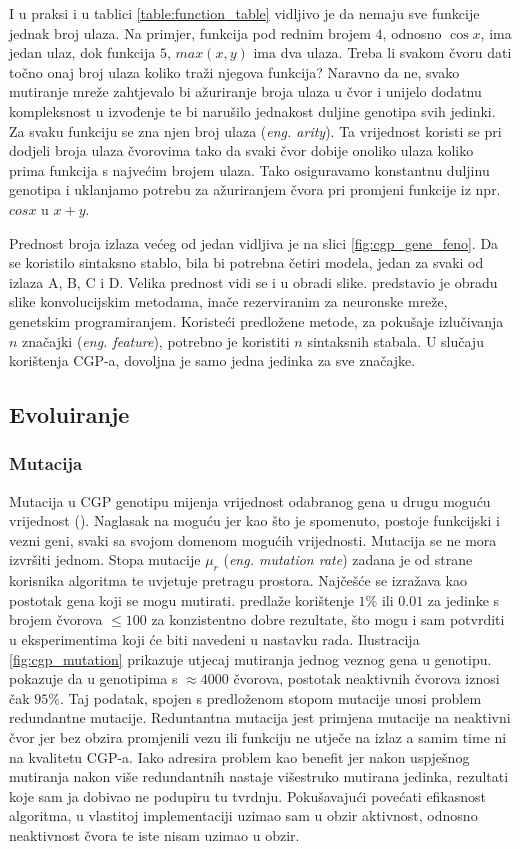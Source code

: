 I u praksi i u tablici \ref{table:function_table} vidljivo je da nemaju sve funkcije jednak broj ulaza.
Na primjer, funkcija pod rednim brojem $4$, odnosno $\cos{x}$, ima jedan ulaz, dok funkcija $5$, $max(x, y)$ ima dva ulaza.
Treba li svakom čvoru dati točno onaj broj ulaza koliko traži njegova funkcija?
Naravno da ne, svako mutiranje mreže zahtjevalo bi ažuriranje broja ulaza u čvor i unijelo dodatnu kompleksnost u izvođenje te bi narušilo jednakost duljine genotipa svih jedinki.
Za svaku funkciju se zna njen broj ulaza (\emph{eng. arity}).
Ta vrijednost koristi se pri dodjeli broja ulaza čvorovima tako da svaki čvor dobije onoliko ulaza koliko prima funkcija s najvećim brojem ulaza.
Tako osiguravamo konstantnu duljinu genotipa i uklanjamo potrebu za ažuriranjem čvora pri promjeni funkcije iz npr. $cos{x}$ u $x + y$.

Prednost broja izlaza većeg od jedan vidljiva je na slici \ref{fig:cgp_gene_feno}.
Da se koristilo sintaksno stablo, bila bi potrebna četiri modela, jedan za svaki od izlaza A, B, C i D.
Velika prednost vidi se i u obradi slike.
\cite{conv_gp} predstavio je obradu slike konvolucijskim metodama, inače rezerviranim za neuronske mreže, genetskim programiranjem.
Koristeći predložene metode, za pokušaje izlučivanja $n$ značajki (\emph{eng. feature}), potrebno je koristiti $n$ sintaksnih stabala.
U slučaju korištenja CGP-a, dovoljna je samo jedna jedinka za sve značajke.

\subsection{Evoluiranje}

\subsubsection{Mutacija}
Mutacija u CGP genotipu mijenja vrijednost odabranog gena u drugu moguću vrijednost (\cite{cgp}).
Naglasak na moguću jer kao što je spomenuto, postoje funkcijski i vezni geni, svaki sa svojom domenom mogućih vrijednosti.
Mutacija se ne mora izvršiti jednom.
Stopa mutacije $\mu_r$ (\emph{eng. mutation rate}) zadana je od strane korisnika algoritma te uvjetuje pretragu prostora.
Najčešće se izražava kao postotak gena koji se mogu mutirati.
\cite{cgp} predlaže korištenje $1\%$ ili $0.01$ za jedinke s brojem čvorova $\leq 100$ za konzistentno dobre rezultate, što mogu i sam potvrditi u eksperimentima koji će biti navedeni u nastavku rada.
Ilustracija \ref{fig:cgp_mutation} prikazuje utjecaj mutiranja jednog veznog gena u genotipu.
\cite{cgp_experiment} pokazuje da u genotipima s $\approx 4000$ čvorova, postotak neaktivnih čvorova iznosi čak $95\%$.
Taj podatak, spojen s predloženom stopom mutacije unosi problem redundantne mutacije.
Reduntantna mutacija jest primjena mutacije na neaktivni čvor jer bez obzira promjenili vezu ili funkciju ne utječe na izlaz a samim time ni na kvalitetu CGP-a.
Iako \cite{cgp} adresira problem kao benefit jer nakon uspješnog mutiranja nakon više redundantnih nastaje višestruko mutirana jedinka, rezultati koje sam ja dobivao ne podupiru tu tvrdnju.
Pokušavajući povećati efikasnost algoritma, u vlastitoj implementaciji uzimao sam u obzir aktivnost, odnosno neaktivnost čvora te iste nisam uzimao u obzir.

